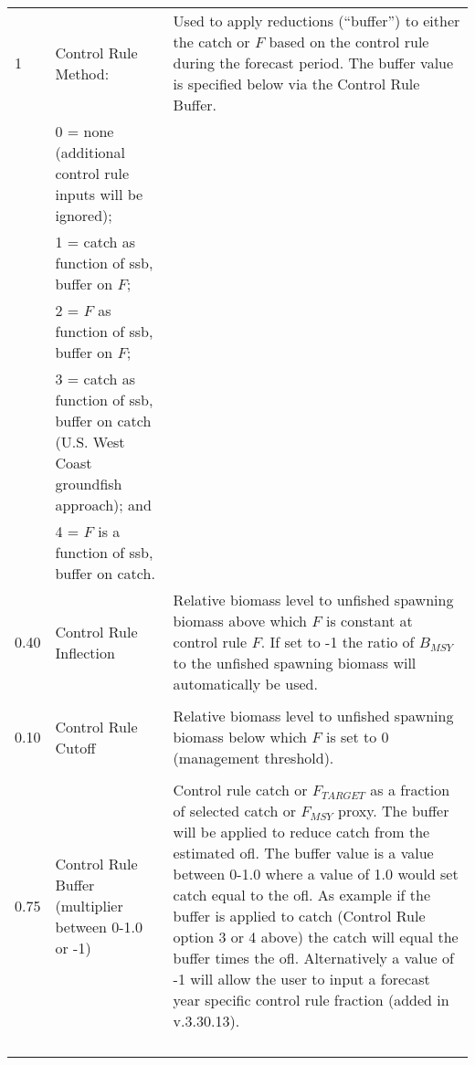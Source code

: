 \begin{landscape}
{\begin{longtable}{p{2cm} p{7cm} p{12cm}}
  \pagebreak
  1 & Control Rule Method: & \multirow{1}{1cm}[-0.15cm]{\parbox{12cm}{Used to apply reductions (``buffer'') to either the catch or $F$ based on the control rule during the forecast period. The buffer value is specified below via the Control Rule Buffer.}} \Tstrut\\
    & 0 = none (additional control rule inputs will be ignored); & \\
    & 1 = catch as function of \gls{ssb}, buffer on $F$; & \\
    & 2 = $F$ as function of \gls{ssb}, buffer on $F$; & \\
    & 3 = catch as function of \gls{ssb}, buffer on catch (U.S. West Coast groundfish approach); and & \\
    & 4 = $F$ is a function of \gls{ssb}, buffer on catch. & \Bstrut\\
  \hline

  0.40 \Tstrut & Control Rule Inflection & \multirow{1}{1cm}[-0.2cm]{\parbox{12cm}{Relative biomass level to unfished spawning biomass above which $F$ is constant at control rule $F$. If set to -1 the ratio of $B_{MSY}$ to the unfished spawning biomass will automatically be used.}} \Bstrut\\
    & & \Tstrut\Bstrut\\

  \hline
  0.10 \Tstrut & Control Rule Cutoff & \multirow{1}{1cm}[-0.2cm]{\parbox{12cm}{Relative biomass level to unfished spawning biomass below which $F$ is set to 0 (management threshold).}} \\
    & & \\

  \hline
  0.75 \Tstrut & Control Rule Buffer (multiplier between 0-1.0 or -1) & \multirow{1}{1cm}[-0.25cm]{\parbox{12cm}{Control rule catch or $F_{TARGET}$ as a fraction of selected catch or $F_{MSY}$ proxy. The buffer will be applied to reduce catch from the estimated \gls{ofl}. The buffer value is a value between 0-1.0 where a value of 1.0 would set catch equal to the \gls{ofl}. As example if the buffer is applied to catch (Control Rule option 3 or 4 above) the catch will equal the buffer times the \gls{ofl}. Alternatively a value of -1 will allow the user to input a forecast year specific control rule fraction (added in v.3.30.13).}} \Bstrut\\ 
    & & \Bstrut\\
    & & \Bstrut\\
    & & \Bstrut\\
    & & \Bstrut\\


\end{longtable}}
\end{landscape}
